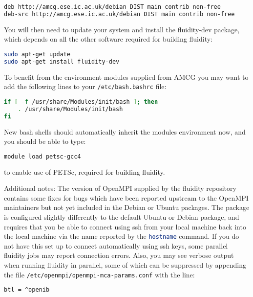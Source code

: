 \begin{lstlisting}[language=bash]
deb http://amcg.ese.ic.ac.uk/debian DIST main contrib non-free
deb-src http://amcg.ese.ic.ac.uk/debian DIST main contrib non-free
\end{lstlisting}

You will then need to update your system and install the fluidity-dev package,
which depends on all the other software required for building fluidity:

\begin{lstlisting}[language=bash]
sudo apt-get update
sudo apt-get install fluidity-dev
\end{lstlisting}

To benefit from the environment modules supplied from AMCG you may want to add
the following lines to your \lstinline[language=bash]+/etc/bash.bashrc+ file:

\begin{lstlisting}[language=bash]
if [ -f /usr/share/Modules/init/bash ]; then
    . /usr/share/Modules/init/bash
fi
\end{lstlisting}

New bash shells should automatically inherit the modules environment now, and
you should be able to type:

\begin{lstlisting}[language=bash]
module load petsc-gcc4
\end{lstlisting}

to enable use of PETSc, required for building fluidity.
 
Additional notes: The version of OpenMPI supplied by the fluidity repository
contains some fixes for bugs which have been reported upstream to the OpenMPI
maintainers but not yet included in the Debian or Ubuntu packages. The package
is configured slightly differently to the default Ubuntu or Debian package, and
requires that you be able to connect using ssh from your local machine back
into the local machine via the name reported by the
\lstinline[language=bash]+hostname+ command. If you do not have this set up to
connect automatically using ssh keys, some parallel fluidity jobs may report
connection errors. Also, you may see verbose output when running fluidity in
parallel, some of which can be suppressed by appending the file
\lstinline[language=bash]+/etc/openmpi/openmpi-mca-params.conf+ with the line:

\begin{lstlisting}[language=bash]
btl = ^openib
\end{lstlisting}

